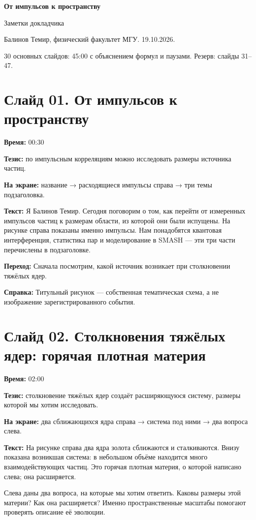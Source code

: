 \documentclass[11pt,a4paper]{article}
\begin{document}
{\LARGE\bfseries\color{ink} От импульсов к пространству}\par
{\large Заметки докладчика}\par
Балинов Темир, физический факультет МГУ. 19.10.2026.\par
30 основных слайдов: 45:00 с объяснением формул и паузами. Резерв: слайды 31–47.\par
\medskip
\section*{Слайд 01. От импульсов к пространству}
\textbf{Время:} 00:30

\textbf{Тезис:} по импульсным корреляциям можно исследовать размеры источника частиц.

\textbf{На экране:} название → расходящиеся импульсы справа → три темы подзаголовка.

\textbf{Текст:} Я Балинов Темир. Сегодня поговорим о том, как перейти от измеренных импульсов частиц к размерам области, из которой они были испущены. На рисунке справа показаны именно импульсы. Нам понадобятся квантовая интерференция, статистика пар и моделирование в SMASH — эти три части перечислены в подзаголовке.

\textbf{Переход:} Сначала посмотрим, какой источник возникает при столкновении тяжёлых ядер.

\textbf{Справка:} Титульный рисунок — собственная тематическая схема, а не изображение зарегистрированного события.

\clearpage
\section*{Слайд 02. Столкновения тяжёлых ядер: горячая плотная материя}
\textbf{Время:} 02:00

\textbf{Тезис:} столкновение тяжёлых ядер создаёт расширяющуюся систему, размеры которой мы хотим исследовать.

\textbf{На экране:} два сближающихся ядра справа → система под ними → два вопроса слева.

\textbf{Текст:} На рисунке справа два ядра золота сближаются и сталкиваются. Внизу показана возникшая система: в небольшом объёме находится много взаимодействующих частиц. Это горячая плотная материя, о которой написано слева; она расширяется.

Слева даны два вопроса, на которые мы хотим ответить. Каковы размеры этой материи? Как она расширяется? Именно пространственные масштабы помогают проверять описание её эволюции.
\end{document}

